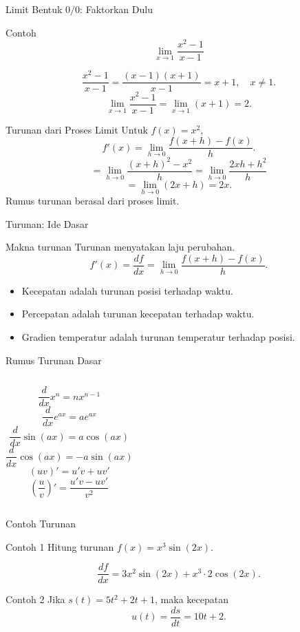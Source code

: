 \documentclass[aspectratio=169,11pt]{beamer}
\begin{document}
\begin{frame}{Limit Bentuk $0/0$: Faktorkan Dulu}
\begin{exampleblock}{Contoh}
\[
\lim_{x\to 1}\frac{x^2-1}{x-1}
\]
\end{exampleblock}
\[
\frac{x^2-1}{x-1}=\frac{(x-1)(x+1)}{x-1}=x+1,\quad x\ne 1.
\]
\[
\lim_{x\to 1}\frac{x^2-1}{x-1}=\lim_{x\to 1}(x+1)=2.
\]
\end{frame}

\begin{frame}{Turunan dari Proses Limit}
Untuk $f(x)=x^2$,
\[
f'(x)=\lim_{h\to0}\frac{f(x+h)-f(x)}{h}.
\]
\[
=\lim_{h\to0}\frac{(x+h)^2-x^2}{h}
=\lim_{h\to0}\frac{2xh+h^2}{h}
\]
\[
=\lim_{h\to0}(2x+h)=2x.
\]
Rumus turunan berasal dari proses limit.
\end{frame}

\begin{frame}{Turunan: Ide Dasar}
\begin{block}{Makna turunan}
Turunan menyatakan laju perubahan.
\[
f'(x)=\frac{df}{dx}=\lim_{h\to 0}\frac{f(x+h)-f(x)}{h}.
\]
\end{block}
\begin{itemize}
  \item Kecepatan adalah turunan posisi terhadap waktu.
  \item Percepatan adalah turunan kecepatan terhadap waktu.
  \item Gradien temperatur adalah turunan temperatur terhadap posisi.
\end{itemize}
\end{frame}

\begin{frame}{Rumus Turunan Dasar}
\begin{columns}
\[
\frac{d}{dx}x^n=nx^{n-1}
\]
\[
\frac{d}{dx}e^{ax}=ae^{ax}
\]
\[
\frac{d}{dx}\sin(ax)=a\cos(ax)
\]
\[
\frac{d}{dx}\cos(ax)=-a\sin(ax)
\]
\[
(uv)'=u'v+uv'
\]
\[
\left(\frac{u}{v}\right)'=\frac{u'v-uv'}{v^2}
\]
\end{columns}
\end{frame}

\begin{frame}{Contoh Turunan}
\begin{exampleblock}{Contoh 1}
Hitung turunan $f(x)=x^3\sin(2x)$.
\end{exampleblock}
\[
\frac{df}{dx}=3x^2\sin(2x)+x^3\cdot 2\cos(2x).
\]
\vspace{0.2cm}
\begin{exampleblock}{Contoh 2}
Jika $s(t)=5t^2+2t+1$, maka kecepatan
\[
u(t)=\frac{ds}{dt}=10t+2.
\]
\end{exampleblock}
\end{frame}
\end{document}
